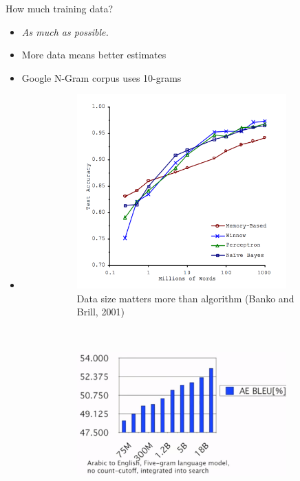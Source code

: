\documentclass[11pt,letterpaper]{article}
\begin{document}
How much training data?
\begin{itemize}
  \item \textit{As much as possible.}
  \item More data means better estimates
  \item Google N-Gram corpus uses 10-grams
  \item[] 
      \begin{figure}[h]
        \centering
        \begin{subfigure}[b]{0.3\textwidth}
                \includegraphics[width=0.95\textwidth]{banko-brill-graph.png}
                \caption{Data size matters more than algorithm (Banko and Brill, 2001)}
        \end{subfigure}%
        ~~~
        \begin{subfigure}[b]{0.3\textwidth}
                \includegraphics[width=0.95\textwidth]{unreasonable-bleu.png}

\end{subfigure}
\end{figure}
\end{itemize}
\end{document}
